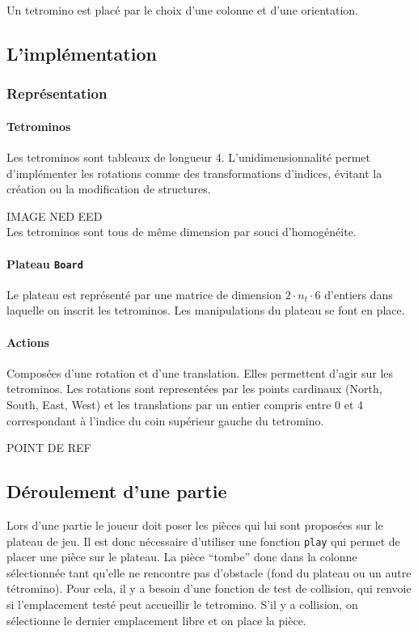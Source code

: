 \documentclass{article}
\begin{document}
Un tetromino est plac\'e par le choix d'une colonne et d'une orientation.

\subsection{L'impl\'ementation}

\subsubsection{Représentation}

\paragraph{Tetrominos}
Les tetrominos sont tableaux de longueur 4. L'unidimensionnalit\'e permet
d'impl\'ementer les rotations comme des transformations d'indices, \'evitant la
cr\'eation ou la modification de structures.

IMAGE NED EED\\
Les tetrominos sont tous de même dimension par souci d'homogénéite.

\paragraph{Plateau \texttt{Board}}
Le plateau est repr\'esent\'e par une matrice de dimension
\(2\cdot n_t\cdot 6\) d'entiers dans laquelle on inscrit les tetrominos. Les
manipulations du plateau se font en place.


\paragraph{Actions}
Composées d'une rotation et d'une translation. Elles permettent d'agir sur les
tetrominos. Les rotations sont representées par les points cardinaux
(North, South, East, West) et les translations par un entier compris entre 0 et
4 correspondant à l'indice du coin supérieur gauche du tetromino.

POINT DE REF

\subsection{D\'eroulement d'une partie}
Lors d'une partie le joueur doit poser les pièces qui lui sont proposées sur
le plateau de jeu. Il est donc nécessaire d'utiliser une fonction \texttt{play}
qui permet de placer une pièce sur le plateau. La pièce ``tombe'' donc dans la
colonne sélectionnée tant qu'elle ne rencontre pas d'obstacle (fond du plateau
ou un autre tétromino). Pour cela, il y a besoin d'une fonction de test de
collision, qui renvoie si l'emplacement testé peut accueillir le tetromino.
S'il y a collision, on sélectionne le dernier emplacement libre et on place la
pièce.
\end{document}

